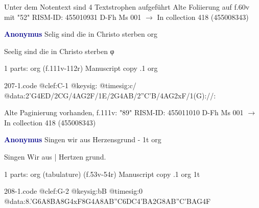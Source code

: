 \documentclass[twocolumn]{book}
\begin{document}
\newline Unter dem Notentext sind 4 Textstrophen aufgeführt
\newline Alte Foliierung auf f.60v mit "52"
\newline RISM-ID: 455010931
\newline D-Fh  Ms 001
\newline $\rightarrow$ In collection 418 (455008343)
      
\newline \par \vspace{7pt} \textcolor{darkblue}{\textbf{Anonymus  }}
\newline Selig sind die in Christo sterben
\newline org
\newline \begin{itshape} Seelig sind die in Christo sterben φ\end{itshape} 
\newline \textcolor{darkblue}{}  1 parts: org  (f.111v-112r)
\newline Manuscript copy
.1  org  
\begin{filecontents*}{207-1.code}
@clef:C-1
@keysig:
@timesig:c/
@data:2'G4ED/2CG/4AG2F/1E/2G4AB/2''C'B/4AG2xF/1(G)://:
\end{filecontents*}
\newline
%

\newline Alte Paginierung vorhanden, f.111v: "89"
\newline RISM-ID: 455011010
\newline D-Fh  Ms 001
\newline $\rightarrow$ In collection 418 (455008343)
      
\newline \par \vspace{7pt} \textcolor{darkblue}{\textbf{Anonymus  }}
\newline Singen wir aus Herzensgrund - 1t
\newline org
\newline \begin{itshape}[f.53v, at left:] Singen Wir aus | Hertzen grund.\end{itshape} 
\newline \textcolor{darkblue}{}  1 parts: org (tabulature)  (f.53v-54r)
\newline Manuscript copy
.1  org  1t  
\begin{filecontents*}{208-1.code}
@clef:G-2
@keysig:bB
@timesig:0
@data:8.'G6A{8BA}8G4xF8G4A{8AB''C6DC}4'BA2G{8AB''C'B}{AG}4F
\end{filecontents*}
\newline
%
\end{document}
